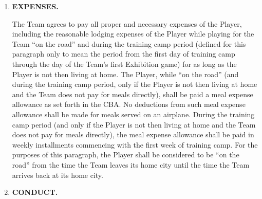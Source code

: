\documentclass[
]{book}
\begin{document}
\begin{enumerate}
\def\labelenumi{\arabic{enumi}.}
\setcounter{enumi}{3}
\item
  \textbf{EXPENSES.}

  The Team agrees to pay all proper and necessary expenses of the Player, including the reasonable lodging expenses of the Player while playing for the Team ``on the road'' and during the training camp period (defined for this paragraph only to mean the period from the first day of training camp through the day of the Team's first Exhibition game) for as long as the Player is not then living at home. The Player, while ``on the road'' (and during the training camp period, only if the Player is not then living at home and the Team does not pay for meals directly), shall be paid a meal expense allowance as set forth in the CBA. No deductions from such meal expense allowance shall be made for meals served on an airplane. During the training camp period (and only if the Player is not then living at home and the Team does not pay for meals directly), the meal expense allowance shall be paid in weekly installments commencing with the first week of training camp. For the purposes of this paragraph, the Player shall be considered to be ``on the road'' from the time the Team leaves its home city until the time the Team arrives back at its home city.
\item
  \textbf{CONDUCT.}
\end{enumerate}
\end{document}
